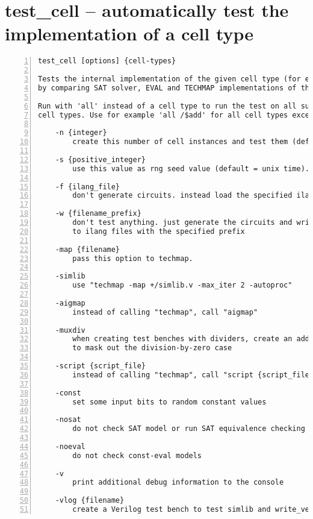 \section{test\_cell -- automatically test the implementation of a cell type}
\label{cmd:test_cell}
\begin{lstlisting}[numbers=left,frame=single]
    test_cell [options] {cell-types}

Tests the internal implementation of the given cell type (for example '$add')
by comparing SAT solver, EVAL and TECHMAP implementations of the cell types..

Run with 'all' instead of a cell type to run the test on all supported
cell types. Use for example 'all /$add' for all cell types except $add.

    -n {integer}
        create this number of cell instances and test them (default = 100).

    -s {positive_integer}
        use this value as rng seed value (default = unix time).

    -f {ilang_file}
        don't generate circuits. instead load the specified ilang file.

    -w {filename_prefix}
        don't test anything. just generate the circuits and write them
        to ilang files with the specified prefix

    -map {filename}
        pass this option to techmap.

    -simlib
        use "techmap -map +/simlib.v -max_iter 2 -autoproc"

    -aigmap
        instead of calling "techmap", call "aigmap"

    -muxdiv
        when creating test benches with dividers, create an additional mux
        to mask out the division-by-zero case

    -script {script_file}
        instead of calling "techmap", call "script {script_file}".

    -const
        set some input bits to random constant values

    -nosat
        do not check SAT model or run SAT equivalence checking

    -noeval
        do not check const-eval models

    -v
        print additional debug information to the console

    -vlog {filename}
        create a Verilog test bench to test simlib and write_verilog
\end{lstlisting}

